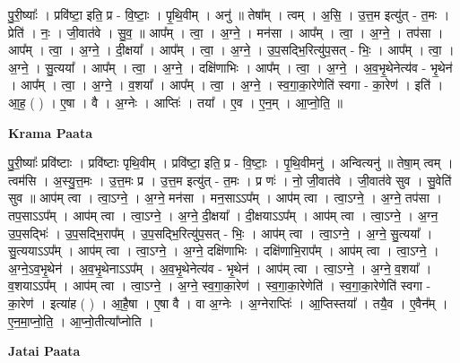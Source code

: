 \documentclass[17pt]{extarticle}
\begin{document}
पु॒री॒ष्याः᳚ । प्रवि॑ष्टा॒ इति॒ प्र - वि॒ष्टाः॒ । पृ॒थि॒वीम् । अनु॑ ॥ तेषा᳚म् । त्वम् । अ॒सि॒ । उ॒त्त॒म इत्यु॑त् - त॒मः । प्रेति॑ । नः॒ । जी॒वात॑वे । सु॒व॒ ॥ आप᳚म् । त्वा॒ । अ॒ग्ने॒ । मन॑सा । आप᳚म् । त्वा॒ । अ॒ग्ने॒ । तप॑सा । आप᳚म् । त्वा॒ । अ॒ग्ने॒ । दी॒क्षया᳚ । आप᳚म् । त्वा॒ । अ॒ग्ने॒ । उ॒प॒सद्भि॒रित्यु॑प॒सत् - भिः॒ । आप᳚म् । त्वा॒ । अ॒ग्ने॒ । सु॒त्यया᳚ । आप᳚म् । त्वा॒ । अ॒ग्ने॒ । दक्षि॑णाभिः । आप᳚म् । त्वा॒ । अ॒ग्ने॒ । अ॒व॒भृ॒थेनेत्य॑व - भृ॒थेन॑ । आप᳚म् । त्वा॒ । अ॒ग्ने॒ । व॒शया᳚ । आप᳚म् । त्वा॒ । अ॒ग्ने॒ । स्व॒गा॒का॒रेणेति॑ स्वगा - का॒रेण॑ । इति॑ । आ॒ह॒ ( ) । ए॒षा । वै । अ॒ग्नेः । आप्तिः॑ । तया᳚ । ए॒व । ए॒न॒म् । आ॒प्नो॒ति॒ ॥  \newline


\textbf{Krama Paata} \newline

पु॒री॒ष्याः᳚ प्रवि॑ष्टाः । प्रवि॑ष्टाः पृथि॒वीम् । प्रवि॑ष्टा॒ इति॒ प्र - वि॒ष्टाः॒ । पृ॒थि॒वीमनु॑ । अन्वित्यनु॑ ॥ तेषा॒म् त्वम् । त्वम॑सि । अ॒स्यु॒त्त॒मः । उ॒त्त॒मः प्र । उ॒त्त॒म इत्यु॑त् - त॒मः । प्र णः॑ । नो॒ जी॒वात॑वे । जी॒वात॑वे सुव । सु॒वेति॑ सुव ॥ आप॑म् त्वा । त्वा॒ऽग्ने॒ । अ॒ग्ने॒ मन॑सा । मन॒साऽऽप᳚म् । आप॑म् त्वा । त्वा॒ऽग्ने॒ । अ॒ग्ने॒ तप॑सा । तप॒साऽऽप᳚म् । आप॑म् त्वा । त्वा॒ऽग्ने॒ । अ॒ग्ने॒ दी॒क्षया᳚ । दी॒क्षयाऽऽप᳚म् । आप॑म् त्वा । त्वा॒ऽग्ने॒ । अ॒ग्न॒ उ॒प॒सद्भिः॑ । उ॒प॒सद्भि॒राप᳚म् । उ॒प॒सद्भि॒रित्यु॑प॒सत् - भिः॒ । आप॑म् त्वा । त्वा॒ऽग्ने॒ । अ॒ग्ने॒ सु॒त्यया᳚ । सु॒त्ययाऽऽप᳚म् । आप॑म् त्वा । त्वा॒ऽग्ने॒ । अ॒ग्ने॒ दक्षि॑णाभिः । दक्षि॑णाभि॒राप᳚म् । आप॑म् त्वा । त्वा॒ऽग्ने॒ । अ॒ग्ने॒ऽव॒भृ॒थेन॑ । अ॒व॒भृ॒थेनाऽऽप᳚म् । अ॒व॒भृ॒थेनेत्य॑व - भृ॒थेन॑ । आप॑म् त्वा । त्वा॒ऽग्ने॒ । अ॒ग्ने॒ व॒शया᳚ । व॒शयाऽऽप᳚म् । आप॑म् त्वा । त्वा॒ऽग्ने॒ । अ॒ग्ने॒ स्व॒गा॒का॒रेण॑ । स्व॒गा॒का॒रेणेति॑ । स्व॒गा॒का॒रेणेति॑ स्वगा - का॒रेण॑ । इत्या॑ह ( ) । आ॒है॒षा । ए॒षा वै । वा अ॒ग्नेः । अ॒ग्नेराप्तिः॑ । आ॒प्तिस्तया᳚ । तयै॒व । ए॒वैन᳚म् । ए॒न॒मा॒प्नो॒ति॒ । आ॒प्नो॒तीत्या᳚प्नोति । \newline

\textbf{Jatai Paata} \newline
\end{document}
